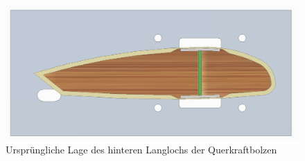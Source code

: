 \begin{figure}[h]
	\includegraphics[width=1.0\textwidth]{Bilder/SeiteRichtig.jpg}
	\caption{Ursprüngliche Lage des hinteren Langlochs der Querkraftbolzen}
	\label{fig: SeiteRichtig}
\end{figure}


